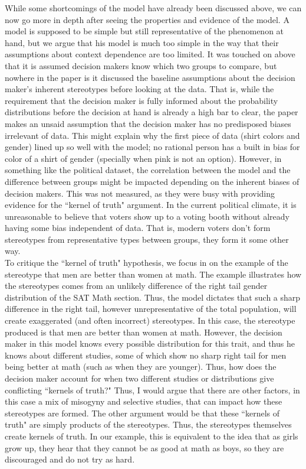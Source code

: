 \documentclass[12pt]{article}
\theoremstyle{definition}
\numberwithin{equation}{section}
\begin{document}
\begin{flushleft}
While some shortcomings of the model have already been discussed above, we can now go more in depth after seeing the properties and evidence of the model. A model is supposed to be simple but still representative of the phenomenon at hand, but we argue that his model is much too simple in the way that their assumptions about context dependence are too limited. It was touched on above that it is assumed decision makers know which two groups to compare, but nowhere in the paper is it discussed the baseline assumptions about the decision maker's inherent stereotypes before looking at the data. That is, while the requirement that the decision maker is fully informed about the probability distributions before the decision at hand is already a high bar to clear, the paper makes an unsaid assumption that the decision maker has no predisposed biases irrelevant of data. This might explain why the first piece of data (shirt colors and gender) lined up so well with the model; no rational person has a built in bias for color of a shirt of gender (specially when pink is not an option). However, in something like the political dataset, the correlation between the model and the difference between groups might be impacted depending on the inherent biases of decision makers. This was not measured, as they were busy with providing evidence for the ``kernel of truth" argument. In the current political climate, it is unreasonable to believe that voters show up to a voting booth without already having some bias independent of data. That is,  modern voters don't form stereotypes from representative types between groups, they form it some other way.\\

To critique the ``kernel of truth" hypothesis, we focus in on the example of the stereotype that men are better than women at math. The example illustrates how the stereotypes comes from an unlikely difference of the right tail gender distribution of the SAT Math section. Thus, the model dictates that such a sharp difference in the right tail, however unrepresentative of the total population, will create exaggerated (and often incorrect) stereotypes. In this case, the stereotype produced is that men are better than women at math. However, the decision maker in this model knows every possible distribution for this trait, and thus he knows about different studies, some of which show no sharp right tail for men being better at math (such as when they are younger). Thus, how does the decision maker account for when two different studies or distributions give conflicting ``kernels of truth?" Thus, I would argue that there are other factors, in this case a mix of misogyny and selective studies, that can impact how these stereotypes are formed. The other argument would be that these ``kernels of truth" are simply products of the stereotypes. Thus, the stereotypes themselves create kernels of truth. In our example, this is equivalent to the idea that as girls grow up, they hear that they cannot be as good at math as boys, so they are discouraged and do not try as hard. \\


\end{flushleft}
\end{document}
